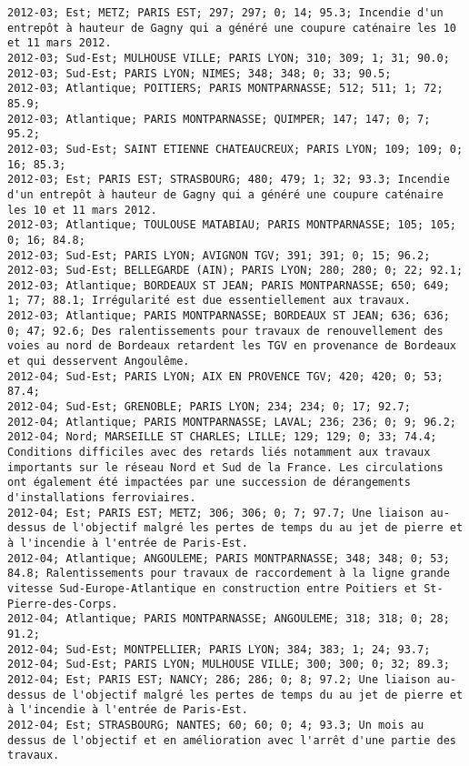 \documentclass{article}
\begin{document}
\begin{Verbatim}[commandchars=\\\{\}]
2012-03; Est; METZ; PARIS EST; 297; 297; 0; 14; 95.3; Incendie d'un entrepôt à hauteur de Gagny qui a généré une coupure caténaire les 10 et 11 mars 2012.
2012-03; Sud-Est; MULHOUSE VILLE; PARIS LYON; 310; 309; 1; 31; 90.0; 
2012-03; Sud-Est; PARIS LYON; NIMES; 348; 348; 0; 33; 90.5; 
2012-03; Atlantique; POITIERS; PARIS MONTPARNASSE; 512; 511; 1; 72; 85.9; 
2012-03; Atlantique; PARIS MONTPARNASSE; QUIMPER; 147; 147; 0; 7; 95.2; 
2012-03; Sud-Est; SAINT ETIENNE CHATEAUCREUX; PARIS LYON; 109; 109; 0; 16; 85.3; 
2012-03; Est; PARIS EST; STRASBOURG; 480; 479; 1; 32; 93.3; Incendie d'un entrepôt à hauteur de Gagny qui a généré une coupure caténaire les 10 et 11 mars 2012.
2012-03; Atlantique; TOULOUSE MATABIAU; PARIS MONTPARNASSE; 105; 105; 0; 16; 84.8; 
2012-03; Sud-Est; PARIS LYON; AVIGNON TGV; 391; 391; 0; 15; 96.2; 
2012-03; Sud-Est; BELLEGARDE (AIN); PARIS LYON; 280; 280; 0; 22; 92.1; 
2012-03; Atlantique; BORDEAUX ST JEAN; PARIS MONTPARNASSE; 650; 649; 1; 77; 88.1; Irrégularité est due essentiellement aux travaux.
2012-03; Atlantique; PARIS MONTPARNASSE; BORDEAUX ST JEAN; 636; 636; 0; 47; 92.6; Des ralentissements pour travaux de renouvellement des voies au nord de Bordeaux retardent les TGV en provenance de Bordeaux et qui desservent Angoulême.
2012-04; Sud-Est; PARIS LYON; AIX EN PROVENCE TGV; 420; 420; 0; 53; 87.4; 
2012-04; Sud-Est; GRENOBLE; PARIS LYON; 234; 234; 0; 17; 92.7; 
2012-04; Atlantique; PARIS MONTPARNASSE; LAVAL; 236; 236; 0; 9; 96.2; 
2012-04; Nord; MARSEILLE ST CHARLES; LILLE; 129; 129; 0; 33; 74.4; Conditions difficiles avec des retards liés notamment aux travaux importants sur le réseau Nord et Sud de la France. Les circulations ont également été impactées par une succession de dérangements d'installations ferroviaires.
2012-04; Est; PARIS EST; METZ; 306; 306; 0; 7; 97.7; Une liaison au-dessus de l'objectif malgré les pertes de temps du au jet de pierre et à l'incendie à l'entrée de Paris-Est.
2012-04; Atlantique; ANGOULEME; PARIS MONTPARNASSE; 348; 348; 0; 53; 84.8; Ralentissements pour travaux de raccordement à la ligne grande vitesse Sud-Europe-Atlantique en construction entre Poitiers et St-Pierre-des-Corps.
2012-04; Atlantique; PARIS MONTPARNASSE; ANGOULEME; 318; 318; 0; 28; 91.2; 
2012-04; Sud-Est; MONTPELLIER; PARIS LYON; 384; 383; 1; 24; 93.7; 
2012-04; Sud-Est; PARIS LYON; MULHOUSE VILLE; 300; 300; 0; 32; 89.3; 
2012-04; Est; PARIS EST; NANCY; 286; 286; 0; 8; 97.2; Une liaison au-dessus de l'objectif malgré les pertes de temps du au jet de pierre et à l'incendie à l'entrée de Paris-Est.
2012-04; Est; STRASBOURG; NANTES; 60; 60; 0; 4; 93.3; Un mois au dessus de l'objectif et en amélioration avec l'arrêt d'une partie des travaux.

\end{Verbatim}
\end{document}
